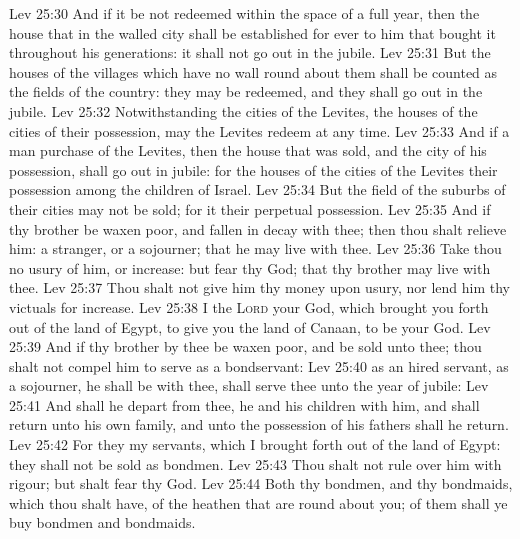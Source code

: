 \vs Lev 25:30 And if it be not redeemed within the space of a full year, then the house that  in the walled city shall be established for ever to him that bought it throughout his generations: it shall not go out in the jubile.
\vs Lev 25:31 But the houses of the villages which have no wall round about them shall be counted as the fields of the country: they may be redeemed, and they shall go out in the jubile.
\vs Lev 25:32 Notwithstanding the cities of the Levites,  the houses of the cities of their possession, may the Levites redeem at any time.
\vs Lev 25:33 And if a man purchase of the Levites, then the house that was sold, and the city of his possession, shall go out in  jubile: for the houses of the cities of the Levites  their possession among the children of Israel.
\vs Lev 25:34 But the field of the suburbs of their cities may not be sold; for it  their perpetual possession.
\vs Lev 25:35 And if thy brother be waxen poor, and fallen in decay with thee; then thou shalt relieve him:  a stranger, or a sojourner; that he may live with thee.
\vs Lev 25:36 Take thou no usury of him, or increase: but fear thy God; that thy brother may live with thee.
\vs Lev 25:37 Thou shalt not give him thy money upon usury, nor lend him thy victuals for increase.
\vs Lev 25:38 I  the \textsc{Lord} your God, which brought you forth out of the land of Egypt, to give you the land of Canaan,  to be your God.
\vs Lev 25:39 And if thy brother  by thee be waxen poor, and be sold unto thee; thou shalt not compel him to serve as a bondservant:
\vs Lev 25:40  as an hired servant,  as a sojourner, he shall be with thee,  shall serve thee unto the year of jubile:
\vs Lev 25:41 And  shall he depart from thee,  he and his children with him, and shall return unto his own family, and unto the possession of his fathers shall he return.
\vs Lev 25:42 For they  my servants, which I brought forth out of the land of Egypt: they shall not be sold as bondmen.
\vs Lev 25:43 Thou shalt not rule over him with rigour; but shalt fear thy God.
\vs Lev 25:44 Both thy bondmen, and thy bondmaids, which thou shalt have,  of the heathen that are round about you; of them shall ye buy bondmen and bondmaids.
